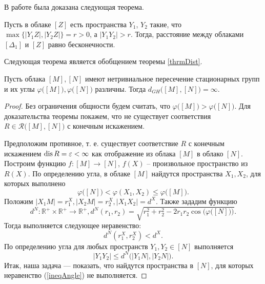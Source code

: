 В работе \cite{nesterov2025gromovhausdorffdistancecloudbounded} была
доказана следующая теорема.
\begin{thm}
  Пусть в облаке \( [Z] \) есть пространства $Y_{1}$, $ Y_{2}$ такие,
  что \\$\max\big\{ |Y_{1}Z|, |Y_{2} Z| \big\} = r>0$, а $|Y_{1}
  Y_{2}|>r$. Тогда, расстояние между облаками $[\Delta_1]$ и $[Z]$
  равно бесконечности. \label{thrmDist}
\end{thm}
Следующая теорема является обобщением теоремы \ref{thrmDist}.
\begin{thm}
  Пусть облака \( [M], [N] \) имеют нетривиальное пересечение
  стационарных групп и их углы \( \varphi \big([M]\big), \varphi
  \big([N]\big) \) различны. Тогда \( d_{GH} \big([M], [N]\big) =
  \infty \).
\end{thm}
\begin{proof}
  Без ограничения общности будем считать, что \( \varphi \big([M]\big)>
  \varphi \big([N]\big) \). Для доказательства теоремы покажем, что не
  существует соответствия \( R\in \mathcal{R}\big([M],[N]\big) \) с
  конечным искажением.

  Предположим противное, т. е. существует соответствие \( R \) с
  конечным искажением \( \operatorname{dis} R = \varepsilon < \infty \) как
  отображение из облака \( [M] \) в облако \( [N] \). Построим функцию
  \( f \colon [M] \rightarrow [N] \), \( f(X) \) -- произвольное
  пространство из \(
    R(X)
  \). По определению угла, в облаке \( [M] \) найдутся пространства \(
  X_1, X_2 \), для которых выполнено
  \[
    \varphi \big([N]\big) < \varphi (X_1, X_2) \le \varphi
  \big([M]\big). \]
  Положим \( |X_1 M| = r_1^X,  |X_2 M| = r_2^X, | X_1 X_2 | = d^X\).
  Также зададим функцию
  \[ d^N \colon \mathbb{R}^+ \times \mathbb{R}^+ \rightarrow
    \mathbb{R}^+, d^N(r_1, r_2) =
    \sqrt{r_1^2 + r_2^2 - 2r_1r_2\cos\Big(\varphi \big([N]\big)\Big)}.
  \]
  Тогда выполняется следующее неравенство:
  \begin{equation}
    d^N(r_1^X, r_2^X) < d^X.
    \label{ineqdx}
  \end{equation}
  По определению угла для любых пространств \( Y_1, Y_2 \in [N] \)
  выполняется
  \begin{equation}
    | Y_1 Y_2 | \le d^N\big(| Y_1N |, | Y_2N |\big). \label{ineqAngle}
  \end{equation}
  Итак, наша задача --- показать, что найдутся пространства в \( [N]
  \), для которых неравенство (\ref{ineqAngle}) не выполняется.


\end{proof}
